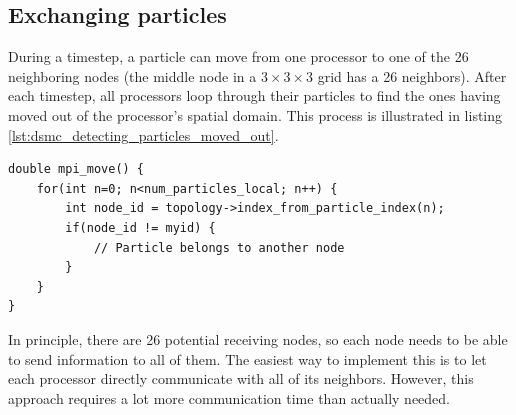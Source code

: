 \subsection{Exchanging particles}
\label{sec:dsmc_parallelization_exchange_particles}
During a timestep, a particle can move from one processor to one of the 26 neighboring nodes (the middle node in a $3\times3\times3$ grid has a 26 neighbors). After each timestep, all processors loop through their particles to find the ones having moved out of the processor's spatial domain. This process is illustrated in listing \ref{lst:dsmc_detecting_particles_moved_out}.
\begin{lstlisting}[caption=Detecting which particles moved out of a processor's spatial domain., label=lst:dsmc_detecting_particles_moved_out]
double mpi_move() {
	for(int n=0; n<num_particles_local; n++) {
		int node_id = topology->index_from_particle_index(n);
		if(node_id != myid) {
			// Particle belongs to another node
		}
	}
}
\end{lstlisting}
In principle, there are 26 potential receiving nodes, so each node needs to be able to send information to all of them. The easiest way to implement this is to let each processor directly communicate with all of its neighbors. However, this approach requires a lot more communication time than actually needed.

